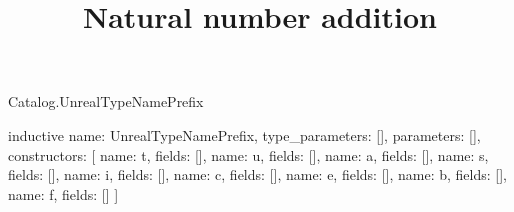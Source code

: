 \begin{lexlean}{Catalog.UnrealTypeNamePrefix}
\title{Natural number addition}
\begin{semanticmodule}
inductive{
  name: UnrealTypeNamePrefix,
  type_parameters: [],
  parameters: [],
  constructors: [
    {name: t, fields: []},
    {name: u, fields: []},
    {name: a, fields: []},
    {name: s, fields: []},
    {name: i, fields: []},
    {name: c, fields: []},
    {name: e, fields: []},
    {name: b, fields: []},
    {name: f, fields: []}
  ]
}
\end{semanticmodule}
\end{lexlean}

